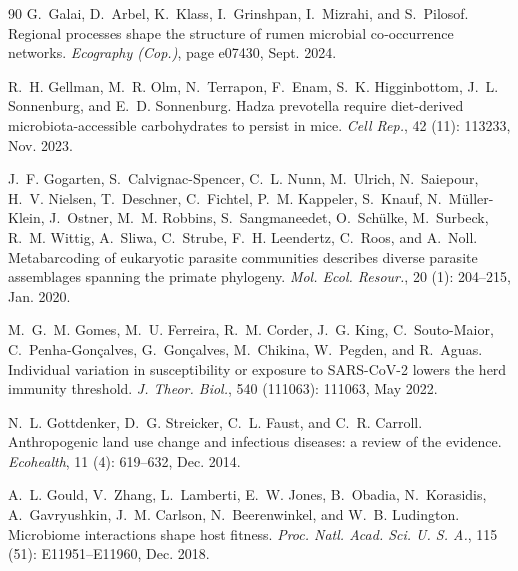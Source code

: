 \documentclass[oneside, a4paper, onecolumn, 11pt]{article}
\begin{document}
\begin{thebibliography}{90}
G.~Galai, D.~Arbel, K.~Klass, I.~Grinshpan, I.~Mizrahi, and S.~Pilosof.
\newblock Regional processes shape the structure of rumen microbial co‐occurrence networks.
\newblock \emph{Ecography (Cop.)}, page e07430, Sept. 2024.

R.~H. Gellman, M.~R. Olm, N.~Terrapon, F.~Enam, S.~K. Higginbottom, J.~L. Sonnenburg, and E.~D. Sonnenburg.
\newblock Hadza prevotella require diet-derived microbiota-accessible carbohydrates to persist in mice.
\newblock \emph{Cell Rep.}, 42 (11): 113233, Nov. 2023.

J.~F. Gogarten, S.~Calvignac-Spencer, C.~L. Nunn, M.~Ulrich, N.~Saiepour, H.~V. Nielsen, T.~Deschner, C.~Fichtel, P.~M. Kappeler, S.~Knauf, N.~Müller-Klein, J.~Ostner, M.~M. Robbins, S.~Sangmaneedet, O.~Schülke, M.~Surbeck, R.~M. Wittig, A.~Sliwa, C.~Strube, F.~H. Leendertz, C.~Roos, and A.~Noll.
\newblock Metabarcoding of eukaryotic parasite communities describes diverse parasite assemblages spanning the primate phylogeny.
\newblock \emph{Mol. Ecol. Resour.}, 20 (1): 204--215, Jan. 2020.

M.~G.~M. Gomes, M.~U. Ferreira, R.~M. Corder, J.~G. King, C.~Souto-Maior, C.~Penha-Gonçalves, G.~Gonçalves, M.~Chikina, W.~Pegden, and R.~Aguas.
\newblock Individual variation in susceptibility or exposure to {SARS}-{CoV}-2 lowers the herd immunity threshold.
\newblock \emph{J. Theor. Biol.}, 540 (111063): 111063, May 2022.

N.~L. Gottdenker, D.~G. Streicker, C.~L. Faust, and C.~R. Carroll.
\newblock Anthropogenic land use change and infectious diseases: a review of the evidence.
\newblock \emph{Ecohealth}, 11 (4): 619--632, Dec. 2014.

A.~L. Gould, V.~Zhang, L.~Lamberti, E.~W. Jones, B.~Obadia, N.~Korasidis, A.~Gavryushkin, J.~M. Carlson, N.~Beerenwinkel, and W.~B. Ludington.
\newblock Microbiome interactions shape host fitness.
\newblock \emph{Proc. Natl. Acad. Sci. U. S. A.}, 115 (51): E11951--E11960, Dec. 2018.


\end{thebibliography}
\end{document}
